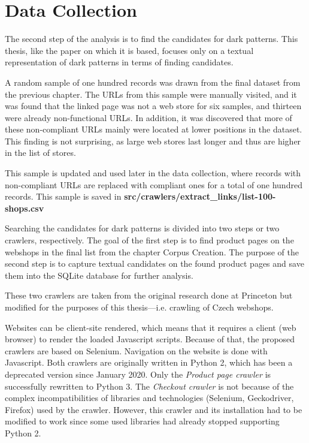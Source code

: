 \chapter{Data Collection}
    The second step of the analysis is to find the candidates for dark patterns. This thesis, like the paper on which it is based\cite{dark-patterns-at-scale}, focuses only on a textual representation of dark patterns in terms of finding candidates.

    A random sample of one hundred records was drawn from the final dataset from the previous chapter. The URLs from this sample were manually visited, and it was found that the linked page was not a web store for six samples, and thirteen were already non-functional URLs. In addition, it was discovered that more of these non-compliant URLs mainly were located at lower positions in the dataset. This finding is not surprising, as large web stores last longer and thus are higher in the list of stores.

    This sample is updated and used later in the data collection, where records with non-compliant URLs are replaced with compliant ones for a total of one hundred records. This sample is saved in \textbf{src/crawlers/extract\_links/list-100-shops.csv}

    Searching the candidates for dark patterns is divided into two steps or two crawlers, respectively. The goal of the first step is to find product pages on the webshops in the final list from the chapter Corpus Creation. The purpose of the second step is to capture textual candidates on the found product pages and save them into the SQLite database for further analysis.

    These two crawlers are taken from the original research done at Princeton but modified for the purposes of this thesis---i.e. crawling of Czech webshops.

    Websites can be client-site rendered, which means that it requires a client (web browser) to render the loaded Javascript scripts. Because of that, the proposed crawlers are based on Selenium. Navigation on the website is done with Javascript.  Both crawlers are originally written in Python 2, which has been a deprecated version since January 2020. Only the \emph{Product page crawler} is successfully rewritten to Python 3. The \emph{Checkout crawler} is not because of the complex incompatibilities of libraries and technologies (Selenium, Geckodriver, Firefox) used by the crawler. However, this crawler and its installation had to be modified to work since some used libraries had already stopped supporting Python 2.


